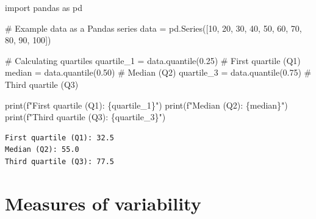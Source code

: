 \documentclass[
  english,
  letterpaper,
  DIV=11,
  numbers=noendperiod]{scrreprt}
\newenvironment{Shaded}{\begin{snugshade}}{\end{snugshade}}
\newcommand{\BuiltInTok}[1]{\textcolor[rgb]{0.00,0.23,0.31}{#1}}
\newcommand{\CommentTok}[1]{\textcolor[rgb]{0.37,0.37,0.37}{#1}}
\newcommand{\DecValTok}[1]{\textcolor[rgb]{0.68,0.00,0.00}{#1}}
\newcommand{\FloatTok}[1]{\textcolor[rgb]{0.68,0.00,0.00}{#1}}
\newcommand{\ImportTok}[1]{\textcolor[rgb]{0.00,0.46,0.62}{#1}}
\newcommand{\NormalTok}[1]{\textcolor[rgb]{0.00,0.23,0.31}{#1}}
\newcommand{\OperatorTok}[1]{\textcolor[rgb]{0.37,0.37,0.37}{#1}}
\newcommand{\SpecialCharTok}[1]{\textcolor[rgb]{0.37,0.37,0.37}{#1}}
\newcommand{\SpecialStringTok}[1]{\textcolor[rgb]{0.13,0.47,0.30}{#1}}
\begin{document}
\begin{Shaded}
\begin{Highlighting}[]
\ImportTok{import}\NormalTok{ pandas }\ImportTok{as}\NormalTok{ pd}

\CommentTok{\# Example data as a Pandas series}
\NormalTok{data }\OperatorTok{=}\NormalTok{ pd.Series([}\DecValTok{10}\NormalTok{, }\DecValTok{20}\NormalTok{, }\DecValTok{30}\NormalTok{, }\DecValTok{40}\NormalTok{, }\DecValTok{50}\NormalTok{, }\DecValTok{60}\NormalTok{, }\DecValTok{70}\NormalTok{, }\DecValTok{80}\NormalTok{, }\DecValTok{90}\NormalTok{, }\DecValTok{100}\NormalTok{])}

\CommentTok{\# Calculating quartiles}
\NormalTok{quartile\_1 }\OperatorTok{=}\NormalTok{ data.quantile(}\FloatTok{0.25}\NormalTok{)  }\CommentTok{\# First quartile (Q1)}
\NormalTok{median }\OperatorTok{=}\NormalTok{ data.quantile(}\FloatTok{0.50}\NormalTok{)      }\CommentTok{\# Median (Q2)}
\NormalTok{quartile\_3 }\OperatorTok{=}\NormalTok{ data.quantile(}\FloatTok{0.75}\NormalTok{)  }\CommentTok{\# Third quartile (Q3)}

\BuiltInTok{print}\NormalTok{(}\SpecialStringTok{f"First quartile (Q1): }\SpecialCharTok{\{}\NormalTok{quartile\_1}\SpecialCharTok{\}}\SpecialStringTok{"}\NormalTok{)}
\BuiltInTok{print}\NormalTok{(}\SpecialStringTok{f"Median (Q2): }\SpecialCharTok{\{}\NormalTok{median}\SpecialCharTok{\}}\SpecialStringTok{"}\NormalTok{)}
\BuiltInTok{print}\NormalTok{(}\SpecialStringTok{f"Third quartile (Q3): }\SpecialCharTok{\{}\NormalTok{quartile\_3}\SpecialCharTok{\}}\SpecialStringTok{"}\NormalTok{)}
\end{Highlighting}
\end{Shaded}

\begin{verbatim}
First quartile (Q1): 32.5
Median (Q2): 55.0
Third quartile (Q3): 77.5
\end{verbatim}

\section{Measures of variability}\label{measures-of-variability}
\end{document}
